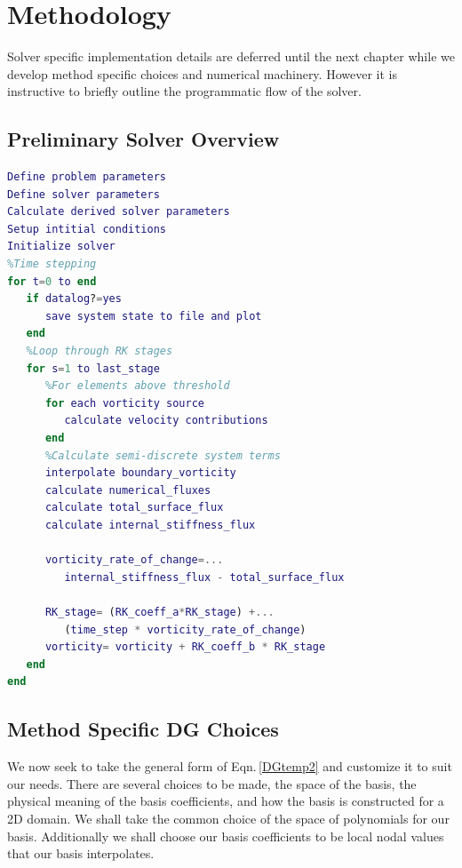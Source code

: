 \documentclass[letterpaper,12pt]{report}
\begin{document}
\chapter{Methodology}
Solver specific implementation details are deferred until the next chapter while we develop method specific choices and numerical machinery. However it is instructive to briefly outline the programmatic flow of the solver.
\section{Preliminary Solver Overview}\label{Pseudo1}
\vspace{-1cm}
\singlespacing
\begin{lstlisting}[language=Matlab]
Define problem parameters
Define solver parameters
Calculate derived solver parameters
Setup intitial conditions
Initialize solver
%Time stepping
for t=0 to end
   if datalog?=yes
      save system state to file and plot
   end
   %Loop through RK stages
   for s=1 to last_stage
      %For elements above threshold
      for each vorticity source
         calculate velocity contributions
      end
      %Calculate semi-discrete system terms
      interpolate boundary_vorticity
      calculate numerical_fluxes
      calculate total_surface_flux
      calculate internal_stiffness_flux
		
      vorticity_rate_of_change=...
         internal_stiffness_flux - total_surface_flux
		
      RK_stage= (RK_coeff_a*RK_stage) +...
         (time_step * vorticity_rate_of_change)
      vorticity= vorticity + RK_coeff_b * RK_stage
   end
end
\end{lstlisting}
\doublespacing

%
\section{Method Specific DG Choices} \label{DGchoice}
We now seek to take the general form of Eqn.\,\eqref{DGtemp2} and customize it to suit our needs. There are several choices to be made, the space of the basis, the physical meaning of the basis coefficients, and how the basis is constructed for a 2D domain. We shall take the common choice of the space of polynomials for our basis. Additionally we shall choose our basis coefficients to be local nodal values that our basis interpolates.
\end{document}
